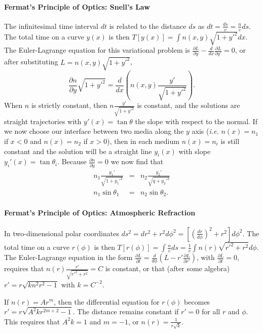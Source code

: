 \documentclass[letterpaper,11pt]{article}
\begin{document}
\paragraph*{Fermat's Principle of Optics: Snell's Law}
The infinitesimal time interval $dt$ is related to the distance $ds$ as $dt = \frac{ds}{v} = \frac{n}{c} ds$.  The total time on a curve $y(x)$ is then $T[y(x)] = \int n(x,y) \sqrt{1 + y'^2} dx$.  The Euler-Lagrange equation for this variational problem is $\frac{\partial L}{\partial y} - \frac{d}{dx} \frac{\partial L}{\partial y'} = 0$, or after substituting $L = n(x,y) \sqrt{1 + y'^2}$,
\begin{equation*}
 \frac{\partial n}{\partial y} \sqrt{1 + y'^2} = \frac{d}{dx} \left( n(x,y) \frac{y'}{\sqrt{1 + y'^2}} \right).
\end{equation*}
When $n$ is strictly constant, then $n \frac{y'}{\sqrt{1 + y'^2}}$ is constant, and the solutions are straight trajectories with $y'(x) = \tan\theta$ the slope with respect to the normal.  If we now choose our interface between two media along the $y$ axis (\textit{i.e.} $n(x) = n_1$ if $x < 0$ and $n(x) = n_2$ if $x > 0$), then in each medium $n(x) = n_i$ is still constant and the solution will be a straight line $y_i(x)$ with slope $y_i'(x) = \tan\theta_i$.  Because $\frac{\partial n}{\partial y} = 0$ we now find that
\begin{eqnarray*}
 n_1 \frac{y_1'}{\sqrt{1 + y_1'^2}} & = & n_2 \frac{y_2'}{\sqrt{q + y_2'^2}} \\
 n_1 \sin\theta_1 & = & n_2 \sin\theta_2.
\end{eqnarray*}

\paragraph*{Fermat's Principle of Optics: Atmospheric Refraction}
In two-dimensional polar coordinates $ds^2 = dr^2 + r^2 d\phi^2 = \left[ \left(\frac{dr}{d\phi}\right)^2 + r^2 \right] d\phi^2$.  The total time on a curve $r(\phi)$ is then $T[r(\phi)] = \int \frac{n}{c} ds = \frac{1}{c} \int n(r) \sqrt{r'^2 + r^2} d\phi$.  The Euler-Lagrange equation in the form $\frac{\partial L}{\partial t} = \frac{d}{d\phi} \left( L - r' \frac{\partial L}{\partial r'} \right)$, with $\frac{\partial L}{\partial t} = 0$, requires that $n(r) \frac{r'}{\sqrt{r'^2 + r^2}} = C$ is constant, or that (after some algebra) $r' = r \sqrt{k n^2 r^2 - 1}$ with $k = C^{-2}$.

If $n(r) = A r^m$, then the differential equation for $r(\phi)$ becomes $r' = r \sqrt{A^2 k r^{2m + 2} - 1}$.  The distance remains constant if $r' = 0$ for all $r$ and $\phi$.  This requires that $A^2 k = 1$ and $m = -1$, or $n(r) = \frac{1}{r\sqrt{k}}$.
\end{document}
